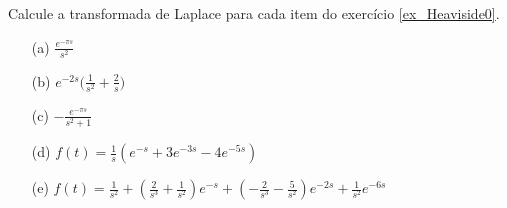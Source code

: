\documentclass[Main.tex]{subfiles}
\begin{document}
\begin{Exercise} Calcule a transformada de Laplace para cada item do exercício \ref{ex_Heaviside0}.
\end{Exercise}
\begin{Answer}
 \begin{itemize}
   \item[(a)] $\displaystyle \frac{e^{-\pi s}}{s^2}$
  \item[(b)] $\displaystyle e^{-2s}\bigg(\frac{1}{s^2}  + \frac{2}{s}\bigg)$
  \item[(c)] $\displaystyle - \frac{e^{-\pi s}}{s^2 +1}$

 \item[(d)] $f(t)=\frac{1}{s}\left(e^{-s}+3e^{-3s}-4e^{-5s}\right)$
    \item[(e)] $f(t)=\frac{1}{s^2}+\left(\frac{2}{s^3}+\frac{1}{s^2}\right)e^{-s}+\left(-\frac{2}{s^3}-\frac{5}{s^2}\right)e^{-2s}+\frac{1}{s^2}e^{-6s}$ 
 \end{itemize}

\end{Answer}
\end{document}
